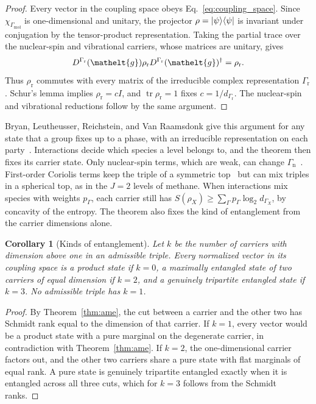 \documentclass[
  reprint,
  aps,
  prx,
  superscriptaddress,
  amsmath,
  amssymb,
  longbibliography
]{revtex4-2}
\newcommand{\eltfont}[1]{{\let\sigma\eltsigma\mathelt{#1}}}
\newcommand{\elt}[1]{\eltfont{#1}}
\newcommand{\repD}[1]{D^{#1}}
\newcommand{\irchar}[1]{\chi_{#1}}
\newcommand{\trace}{\operatorname{tr}}
\newcommand{\gel}{\elt{g}}             %
\newtheorem{corollary}{Corollary}
\providecommand{\Gmol}{\Gamma_{\mathrm{mol}}}
\providecommand{\Grot}{\Gamma_{\mathrm{r}}}
\providecommand{\Gspin}{\Gamma_{\mathrm{n}}}
\begin{document}
\begin{proof}
Every vector in the coupling space obeys Eq.~\eqref{eq:coupling_space}.
Since $\irchar{\Gmol}$ is one-dimensional and unitary, the projector $\rho=\ket{\psi}\!\bra{\psi}$ is invariant under conjugation by the tensor-product representation. Taking the partial trace over the nuclear-spin and vibrational carriers, whose matrices are unitary, gives
\begin{equation}
\repD{\Grot}(\gel)\rho_{\mathrm r}
\repD{\Grot}(\gel)^\dagger=\rho_{\mathrm r}.
\end{equation}
Thus $\rho_{\mathrm r}$ commutes with every matrix of the irreducible complex representation $\Grot$. Schur's lemma implies $\rho_{\mathrm r}=cI$, and $\trace\rho_{\mathrm r}=1$ fixes $c=1/d_{\Grot}$. The nuclear-spin and vibrational reductions follow by the same argument.
\end{proof}
Bryan, Leutheusser, Reichstein, and Van Raamsdonk give this argument for any state that a group fixes up to a phase, with an irreducible representation on each party~\cite{BLRV2019}. Interactions decide which species a level belongs to, and the theorem then fixes its carrier state. Only nuclear-spin terms, which are weak, can change $\Gspin$~\cite{Hougen1963, Chapovsky1999}. First-order Coriolis terms keep the triple of a symmetric top~\cite{Hougen1962} but can mix triples in a spherical top, as in the $J=2$ levels of methane. When interactions mix species with weights $p_\Gamma$, each carrier still has $S(\rho_X)\ge\sum_\Gamma p_\Gamma\log_2 d_{\Gamma_X}$, by concavity of the entropy. The theorem also fixes the kind of entanglement from the carrier dimensions alone.

\begin{corollary}[Kinds of entanglement]
\label{cor:tripartite}
Let $k$ be the number of carriers with dimension above one in an admissible triple. Every normalized vector in its coupling space is a product state if $k=0$, a maximally entangled state of two carriers of equal dimension if $k=2$, and a genuinely tripartite entangled state if $k=3$. No admissible triple has $k=1$.
\end{corollary}

\begin{proof}
By Theorem~\ref{thm:ame}, the cut between a carrier and the other two has Schmidt rank equal to the dimension of that carrier. If $k=1$, every vector would be a product state with a pure marginal on the degenerate carrier, in contradiction with Theorem~\ref{thm:ame}. If $k=2$, the one-dimensional carrier factors out, and the other two carriers share a pure state with flat marginals of equal rank. A pure state is genuinely tripartite entangled exactly when it is entangled across all three cuts, which for $k=3$ follows from the Schmidt ranks.
\end{proof}
\end{document}
